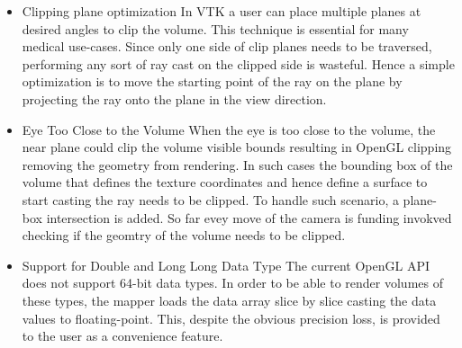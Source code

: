 \begin{itemize}
  \item Clipping plane optimization In VTK a user can place multiple planes at
    desired angles to clip the volume. This technique is essential for many
    medical use-cases. Since only one side of clip planes needs to be traversed,
    performing any sort of ray cast on the clipped side is wasteful. Hence a
    simple optimization is to move the starting point of the ray on the plane by
    projecting the ray onto the plane in the view direction. 

  \item Eye Too Close to the Volume When the eye is too close to the volume, the
    near plane could clip the volume visible bounds resulting in OpenGL clipping
    removing the geometry from rendering. In such cases the bounding box of the
    volume that defines the texture coordinates and hence define a surface to
    start casting the ray needs to be clipped. To handle such scenario, a
    plane-box intersection is added. So far evey move of the camera is funding
    invokved checking if the geomtry of the volume needs to be clipped.

\item Support for Double and Long Long Data Type The current OpenGL API does not
  support 64-bit data types. In order to be able to render volumes of these
    types, the mapper loads the data array slice by slice casting the data
    values to floating-point. This, despite the obvious precision loss, is
    provided to the user as a convenience feature.

\end{itemize}
